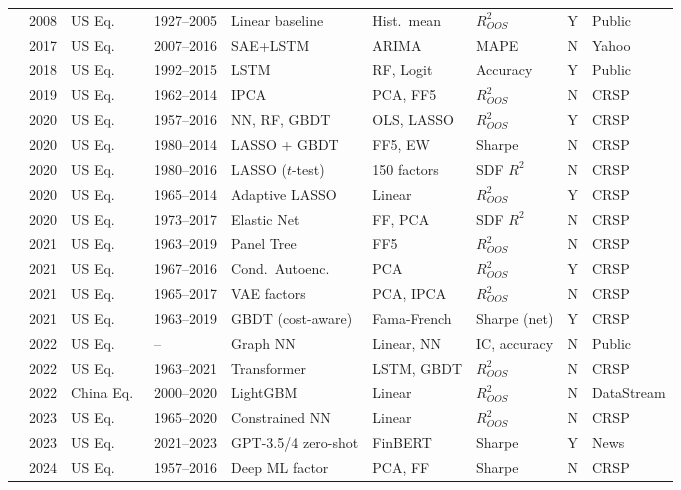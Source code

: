 \begin{longtable}{p{2.4cm} p{0.6cm} p{1.0cm} p{1.0cm} p{2.0cm} p{1.5cm} p{1.3cm} p{0.7cm} p{1.3cm}}
\citet{Welch2008}      & 2008 & US Eq.  & 1927--2005 & Linear baseline   & Hist.\ mean      & $R^2_{OOS}$  & Y & Public \\
\citet{Bao2017}        & 2017 & US Eq.  & 2007--2016 & SAE+LSTM          & ARIMA            & MAPE         & N & Yahoo \\
\citet{Fischer2018}    & 2018 & US Eq.  & 1992--2015 & LSTM              & RF, Logit        & Accuracy     & Y & Public \\
\citet{Kelly2019}      & 2019 & US Eq.  & 1962--2014 & IPCA              & PCA, FF5         & $R^2_{OOS}$  & N & CRSP \\
\citet{Gu2020}         & 2020 & US Eq.  & 1957--2016 & NN, RF, GBDT      & OLS, LASSO       & $R^2_{OOS}$  & Y & CRSP \\
\citet{DeMiguel2020}   & 2020 & US Eq.  & 1980--2014 & LASSO + GBDT      & FF5, EW          & Sharpe       & N & CRSP \\
\citet{Feng2020}       & 2020 & US Eq.  & 1980--2016 & LASSO ($t$-test)  & 150 factors      & SDF $R^2$    & N & CRSP \\
\citet{Freyberger2020} & 2020 & US Eq.  & 1965--2014 & Adaptive LASSO    & Linear           & $R^2_{OOS}$  & Y & CRSP \\
\citet{Kozak2020}      & 2020 & US Eq.  & 1973--2017 & Elastic Net       & FF, PCA          & SDF $R^2$    & N & CRSP \\
\citet{Cong2021}       & 2021 & US Eq.  & 1963--2019 & Panel Tree        & FF5              & $R^2_{OOS}$  & N & CRSP \\
\citet{Gu2021}         & 2021 & US Eq.  & 1967--2016 & Cond.\ Autoenc.   & PCA              & $R^2_{OOS}$  & Y & CRSP \\
\citet{Kim2021}        & 2021 & US Eq.  & 1965--2017 & VAE factors       & PCA, IPCA        & $R^2_{OOS}$  & N & CRSP \\
\citet{Tobek2021}      & 2021 & US Eq.  & 1963--2019 & GBDT (cost-aware) & Fama-French      & Sharpe (net) & Y & CRSP \\
\citet{Chen2022}       & 2022 & US Eq.  & --         & Graph NN          & Linear, NN       & IC, accuracy & N & Public \\
\citet{Duan2022}       & 2022 & US Eq.  & 1963--2021 & Transformer       & LSTM, GBDT       & $R^2_{OOS}$  & N & CRSP \\
\citet{Leippold2022}   & 2022 & China Eq.\ & 2000--2020 & LightGBM       & Linear           & $R^2_{OOS}$  & N & DataStream \\
\citet{Avramov2023}    & 2023 & US Eq.  & 1965--2020 & Constrained NN    & Linear           & $R^2_{OOS}$  & N & CRSP \\
\citet{LopezLira2023}  & 2023 & US Eq.  & 2021--2023 & GPT-3.5/4 zero-shot & FinBERT         & Sharpe       & Y & News \\
\citet{Chen2024}       & 2024 & US Eq.  & 1957--2016 & Deep ML factor    & PCA, FF          & Sharpe       & N & CRSP \\

\end{longtable}

